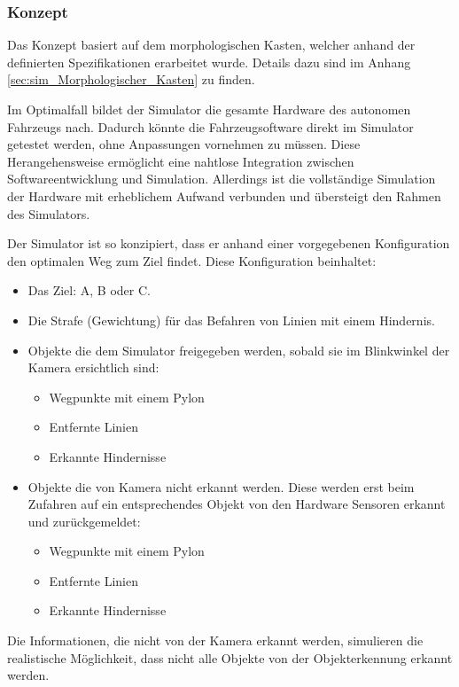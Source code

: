 \documentclass[../main.tex]{subfiles}
\begin{document}
\subsubsection{Konzept}

Das Konzept basiert auf dem morphologischen Kasten, welcher anhand der definierten Spezifikationen erarbeitet wurde. Details dazu sind im Anhang \ref{sec:sim_Morphologischer_Kasten} zu finden.

Im Optimalfall bildet der Simulator die gesamte Hardware des autonomen Fahrzeugs nach. Dadurch könnte die Fahrzeugsoftware direkt im Simulator getestet werden, ohne Anpassungen vornehmen zu müssen. Diese Herangehensweise ermöglicht eine nahtlose Integration zwischen Softwareentwicklung und Simulation. Allerdings ist die vollständige Simulation der Hardware mit erheblichem Aufwand verbunden und übersteigt den Rahmen des Simulators.

Der Simulator ist so konzipiert, dass er anhand einer vorgegebenen Konfiguration den optimalen Weg zum Ziel findet. Diese Konfiguration beinhaltet:
\begin{itemize}
    \item Das Ziel: A, B oder C.
    \item Die Strafe (Gewichtung) für das Befahren von Linien mit einem Hindernis.
    \item Objekte die dem Simulator freigegeben werden, sobald sie im Blinkwinkel der Kamera ersichtlich sind:
     \begin{itemize}
        \item Wegpunkte mit einem Pylon 
        \item Entfernte Linien
        \item Erkannte Hindernisse
     \end{itemize}
   \item Objekte die von Kamera nicht erkannt werden. Diese werden erst beim Zufahren auf ein entsprechendes Objekt von den Hardware Sensoren erkannt und zurückgemeldet:
    \begin{itemize}
      \item Wegpunkte mit einem Pylon 
      \item Entfernte Linien
      \item Erkannte Hindernisse
    \end{itemize}
\end{itemize}

Die Informationen, die nicht von der Kamera erkannt werden, simulieren die realistische Möglichkeit, dass nicht alle Objekte von der Objekterkennung erkannt werden.  
\end{document}
